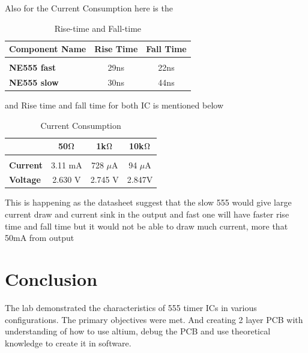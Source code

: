 \documentclass[a4paper,11pt]{article}%
\begin{document}
Also for the Current Consumption here is the

\begin{table}[H]
	\centering

	\begin{tabular}{l c c}

		\textbf{Component Name}&\textbf{Rise Time}&\textbf{Fall Time}\\\hline
		&&\\
		\textbf{NE555 fast}&29ns&22ns\\
		\textbf{NE555 slow}&30ns&44ns\\

	\end{tabular}
	\caption{Rise-time and Fall-time}
	\label{tab_rise_fall}
\end{table}

and Rise time and fall time for both IC is mentioned below

\begin{table}[H]
	\centering

	\begin{tabular}{l c c c}
		\textbf{}&\textbf{50$\ohm$}&\textbf{1k$\ohm$}&\textbf{10k$\ohm$}\\\hline
		&&\\
		\textbf{Current}&3.11 mA&728 $\mu$A&94 $\mu$A\\
		\textbf{Voltage}&2.630 V&2.745 V&2.847V\\
	\end{tabular}
	\caption{Current Consumption}
	\label{tab_curent_consumption}
\end{table}

This is happening as the datasheet suggest that the slow 555 would give large current draw and current sink in the output and fast one will have faster rise time and fall time but it would not be able to draw much current, more that 50mA from output
\pagebreak

\section{Conclusion}

The lab demonstrated the characteristics of 555 timer ICs in various configurations. The primary objectives were met. And creating 2 layer PCB with understanding of how to use altium, debug the PCB and use theoretical knowledge to create it in software.
\end{document}
